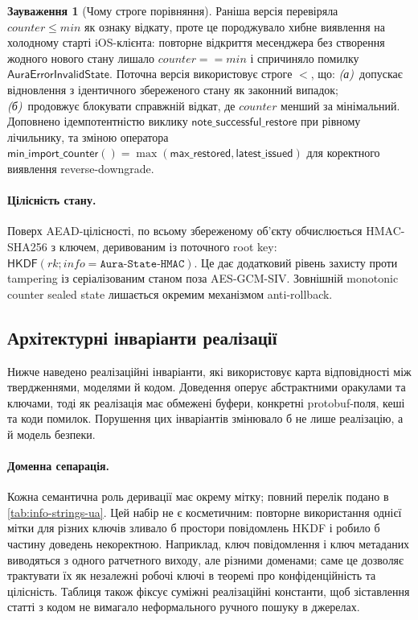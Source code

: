 \documentclass[11pt,a4paper]{article}
\theoremstyle{definition}
\newtheorem{remark}[theorem]{Зауваження}
\newcommand{\HKDF}{\textsf{HKDF}}
\newcommand{\rk}{\ensuremath{\mathit{rk}}}
\begin{document}
\begin{remark}[Чому строге порівняння]\label{rem:strict}
Раніша версія перевіряла $\mathit{counter} \le \mathit{min}$ як
ознаку відкату, проте це породжувало хибне виявлення на холодному
старті iOS-клієнта: повторне відкриття месенджера без створення
жодного нового стану лишало $\mathit{counter} == \mathit{min}$ і
спричиняло помилку $\mathsf{AuraErrorInvalidState}$. Поточна версія використовує строге $<$, що:
\emph{(а)}~допускає відновлення з ідентичного збереженого стану як
законний випадок; \emph{(б)}~продовжує блокувати справжній
відкат, де $\mathit{counter}$ менший за мінімальний. Доповнено
ідемпотентністю виклику $\textsf{note\_successful\_restore}$ при
рівному лічильнику, та зміною оператора
$\textsf{min\_import\_counter}() = \max(\textsf{max\_restored},
\textsf{latest\_issued})$ для коректного виявлення reverse-downgrade.
\end{remark}

\paragraph{Цілісність стану.}
Поверх AEAD-цілісності, по всьому збереженому об'єкту обчислюється
HMAC-SHA256 з ключем, деривованим із поточного root key:
$\HKDF(\rk;\mathit{info}=\texttt{Aura-State-HMAC})$. Це дає додатковий
рівень захисту проти tampering із серіалізованим станом поза
AES-GCM-SIV. Зовнішній monotonic counter sealed state лишається окремим
механізмом anti-rollback.

\subsection{Архітектурні інваріанти реалізації}\label{sec:impl-invariants}

Нижче наведено реалізаційні інваріанти, які використовує карта відповідності
між твердженнями, моделями й кодом. Доведення оперує абстрактними оракулами та ключами, тоді як
реалізація має обмежені буфери, конкретні protobuf-поля, кеші та коди
помилок. Порушення цих інваріантів змінювало б не лише
реалізацію, а й модель безпеки.

\paragraph{Доменна сепарація.}
Кожна семантична роль деривації має окрему мітку; повний перелік подано
в \cref{tab:info-strings-ua}. Цей набір не є косметичним: повторне
використання однієї мітки для різних ключів зливало б простори
повідомлень HKDF і робило б частину доведень некоректною. Наприклад,
ключ повідомлення і ключ метаданих виводяться з одного ратчетного
виходу, але різними доменами; саме це дозволяє трактувати їх як
незалежні робочі ключі в теоремі про конфіденційність та цілісність.
Таблиця також фіксує суміжні реалізаційні константи, щоб зіставлення
статті з кодом не вимагало неформального ручного пошуку в джерелах.
\end{document}
